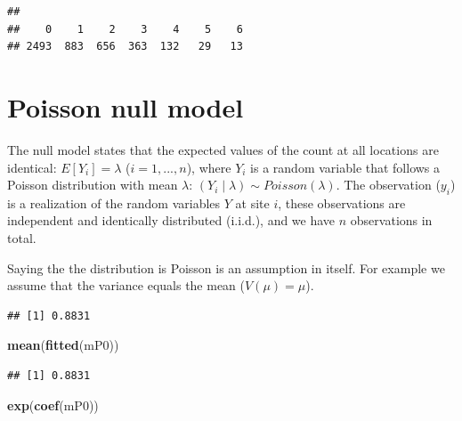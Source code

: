 \documentclass[12pt,]{book}
\newenvironment{Shaded}{\begin{snugshade}}{\end{snugshade}}
\newcommand{\DataTypeTok}[1]{\textcolor[rgb]{0.13,0.29,0.53}{#1}}
\newcommand{\DecValTok}[1]{\textcolor[rgb]{0.00,0.00,0.81}{#1}}
\newcommand{\KeywordTok}[1]{\textcolor[rgb]{0.13,0.29,0.53}{\textbf{#1}}}
\newcommand{\NormalTok}[1]{#1}
\newcommand{\OperatorTok}[1]{\textcolor[rgb]{0.81,0.36,0.00}{\textbf{#1}}}
\newcommand{\StringTok}[1]{\textcolor[rgb]{0.31,0.60,0.02}{#1}}
\begin{document}
\begin{verbatim}
## 
##    0    1    2    3    4    5    6 
## 2493  883  656  363  132   29   13
\end{verbatim}

\hypertarget{poisson-null-model}{%
\section{Poisson null model}\label{poisson-null-model}}

The null model states that the expected values of the count at all locations
are identical: \(E[Y_i]=\lambda\) (\(i=1,...,n\)), where \(Y_i\) is a random variable
that follows a Poisson distribution with mean \(\lambda\):
\((Y_i \mid \lambda) \sim Poisson(\lambda)\).
The observation (\(y_i\)) is a realization of the random variables \(Y\) at site \(i\),
these observations are independent and identically distributed (i.i.d.),
and we have \(n\) observations in total.

Saying the the distribution is Poisson is an assumption in itself. For example
we assume that the variance equals the mean (\(V(\mu)=\mu\)).

\begin{Shaded}
\end{Shaded}

\begin{verbatim}
## [1] 0.8831
\end{verbatim}

\begin{Shaded}
\begin{Highlighting}[]
\KeywordTok{mean}\NormalTok{(}\KeywordTok{fitted}\NormalTok{(mP0))}
\end{Highlighting}
\end{Shaded}

\begin{verbatim}
## [1] 0.8831
\end{verbatim}

\begin{Shaded}
\begin{Highlighting}[]
\KeywordTok{exp}\NormalTok{(}\KeywordTok{coef}\NormalTok{(mP0))}
\end{Highlighting}
\end{Shaded}
\end{document}
